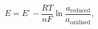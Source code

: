 \documentclass[preview]{standalone}
\begin{document}
\[E = E^\circ - \frac{RT}{nF}\ln\frac{a_\text{reduced}}{a_\text{oxidised}},\]
\end{document}

